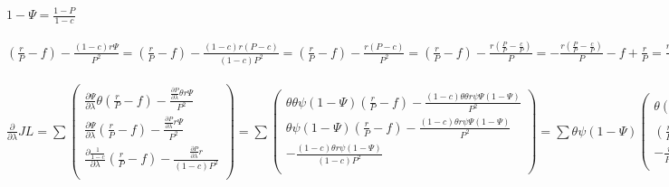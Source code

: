 \documentclass{article}
\begin{document}
$1-\Psi =\frac{1-P}{1-c}$
\\\\
$(\frac{r}{P}-f)-\frac{(1-c) r \Psi }{P^2}=(\frac{r}{P}-f)-\frac{(1-c) r (P-c)}{(1-c) P^2}=(\frac{r}{P}-f)-\frac{r (P-c)}{P^2}=(\frac{r}{P}-f)-\frac{r (\frac{P}{P}-\frac{c}{P})}{P}=-\frac{r (\frac{P}{P}-\frac{c}{P})}{P}-f+\frac{r}{P}=\frac{r (1-(1-\frac{c}{P}))}{P}-f=\frac{c r}{P P}-f=\frac{c r}{P^2}-f \psi (1-\Psi )=\frac{(P-c) (\frac{1-c}{1-c}-\frac{P-c}{1-c})}{1-c}=\frac{(1-P) (P-c)}{(1-c)^2}$
\\\\
$\frac{\partial }{\partial \lambda } JL =
\sum ( \begin{array}{c}
  \frac{\partial \Psi }{\partial \lambda } \theta (\frac{r}{P}-f)-\frac{\frac{\partial P}{\partial \lambda } \theta r \Psi }{P^2} \\
  \frac{\partial \Psi }{\partial \lambda } (\frac{r}{P}-f)-\frac{\frac{\partial P}{\partial \lambda } r \Psi }{P^2} \\
  \frac{\partial \frac{1}{1-c}}{\partial \lambda } (\frac{r}{P}-f)-\frac{\frac{\partial P}{\partial \lambda } r}{(1-c) P^2} \\
\end{array} ) =
\sum ( \begin{array}{c}
  \theta \theta \psi (1-\Psi ) (\frac{r}{P}-f)-\frac{(1-c) \theta \theta r \psi \Psi (1-\Psi )}{P^2} \\
  \theta \psi (1-\Psi ) (\frac{r}{P}-f)-\frac{(1-c) \theta r \psi \Psi (1-\Psi )}{P^2} \\
  -\frac{(1-c) \theta r \psi (1-\Psi )}{(1-c) P^2} \\
\end{array} ) =
\sum \theta \psi (1-\Psi ) ( \begin{array}{c}
  \theta (\frac{r}{P}-f)-\frac{(1-c) \theta r \Psi }{P^2} \\
  (\frac{r}{P}-f)-\frac{(1-c) r \Psi }{P^2} \\
  -\frac{r}{P^2} \\
\end{array} ) =
\sum \theta \psi (1-\Psi ) ( \begin{array}{c}
  \theta (\frac{c r}{P^2}-f) \\
  \frac{c r}{P^2}-f \\
  -\frac{r}{P^2} \\
\end{array} ) =
\sum \theta \psi (1-\Psi ) ( \begin{array}{c}
  \theta (\frac{c r}{P^2}-f) \\
  \frac{c r}{P^2}-f \\
  -\frac{r}{P^2} \\
\end{array} )$
\end{document}
